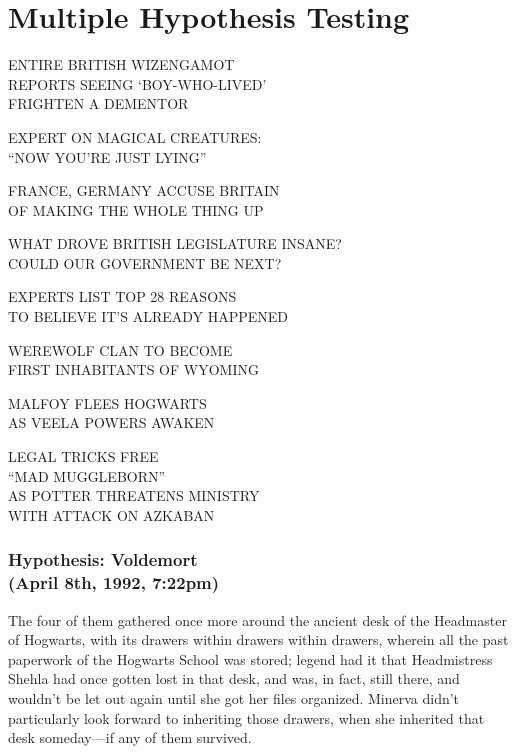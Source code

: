 \chapter{Multiple Hypothesis Testing}

\begin{headlines}


\label{Toronto Magical Tribune:}

ENTIRE BRITISH WIZENGAMOT\\
REPORTS SEEING `BOY-WHO-LIVED'\\
FRIGHTEN A DEMENTOR

EXPERT ON MAGICAL CREATURES:\\
``NOW YOU'RE JUST LYING''

FRANCE, GERMANY ACCUSE BRITAIN\\
OF MAKING THE WHOLE THING UP

\label{New Zealand Spellcrafter's Diurnal Notice:}

WHAT DROVE BRITISH LEGISLATURE INSANE?\\
COULD OUR GOVERNMENT BE NEXT?

EXPERTS LIST TOP 28 REASONS\\
TO BELIEVE IT'S ALREADY HAPPENED

\label{American Mage:}

WEREWOLF CLAN TO BECOME\\
FIRST INHABITANTS OF WYOMING

\label{The Quibbler:}

MALFOY FLEES HOGWARTS\\
AS VEELA POWERS AWAKEN

\label{Daily Prophet:}

LEGAL TRICKS FREE\\
``MAD MUGGLEBORN''\\
AS POTTER THREATENS MINISTRY\\
WITH ATTACK ON AZKABAN
\end{headlines}
\sbreakit

\subsection{Hypothesis: Voldemort\\
(April 8th, 1992, 7:22pm)}

The four of them gathered once more around the ancient desk of the Headmaster 
of Hogwarts, with its drawers within drawers within drawers, wherein all the 
past paperwork of the Hogwarts School was stored; legend had it that 
Headmistress Shehla had once gotten lost in that desk, and was, in fact, still 
there, and wouldn't be let out again until she got her files organized. Minerva 
didn't particularly look forward to inheriting those drawers, when she 
inherited that desk someday---if any of them survived.

